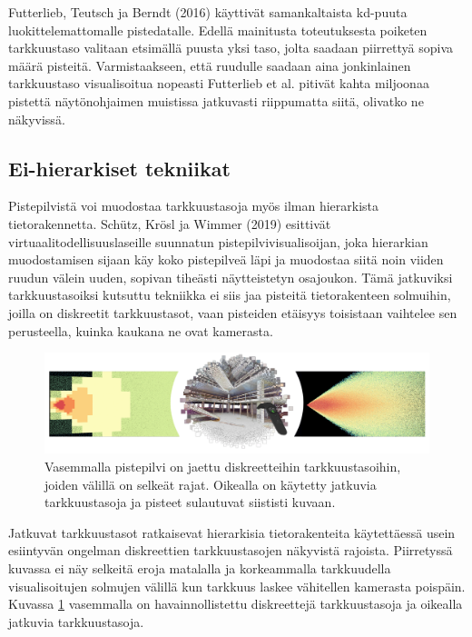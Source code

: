 Futterlieb, Teutsch ja Berndt (2016) käyttivät samankaltaista kd-puuta luokittelemattomalle pistedatalle. Edellä mainitusta toteutuksesta poiketen tarkkuustaso valitaan etsimällä puusta yksi taso, jolta saadaan piirrettyä sopiva määrä pisteitä. Varmistaakseen, että ruudulle saadaan aina jonkinlainen tarkkuustaso visualisoitua nopeasti Futterlieb et al. pitivät kahta miljoonaa pistettä näytönohjaimen muistissa jatkuvasti riippumatta siitä, olivatko ne näkyvissä. \cite{smooth}

\subsection{Ei-hierarkiset tekniikat}\label{ei-hier}

Pistepilvistä voi muodostaa tarkkuustasoja myös ilman hierarkista tietorakennetta. Schütz, Krösl ja Wimmer (2019) esittivät virtuaalitodellisuuslaseille suunnatun pistepilvivisualisoijan, joka hierarkian muodostamisen sijaan käy koko pistepilveä läpi ja muodostaa siitä noin viiden ruudun välein uuden, sopivan tiheästi näytteistetyn osajoukon. Tämä jatkuviksi tarkkuustasoiksi  kutsuttu tekniikka ei siis jaa pisteitä tietorakenteen solmuihin, joilla on diskreetit tarkkuustasot, vaan pisteiden etäisyys toisistaan vaihtelee sen perusteella, kuinka kaukana ne ovat kamerasta. \cite{clod}

\begin{figure}
    \centering
    \includegraphics[width=\textwidth]{img/clod.png}
    \caption{Vasemmalla pistepilvi on jaettu diskreetteihin tarkkuustasoihin, joiden välillä on selkeät rajat. Oikealla on käytetty jatkuvia tarkkuustasoja ja pisteet sulautuvat siististi kuvaan. \cite{clod}}
    \label{img:clod}
\end{figure}

Jatkuvat tarkkuustasot ratkaisevat hierarkisia tietorakenteita käytettäessä usein esiintyvän ongelman diskreettien tarkkuustasojen näkyvistä rajoista. Piirretyssä kuvassa ei näy selkeitä eroja matalalla ja korkeammalla tarkkuudella visualisoitujen solmujen välillä kun tarkkuus laskee vähitellen kamerasta poispäin. Kuvassa \ref{img:clod} vasemmalla on havainnollistettu diskreettejä tarkkuustasoja ja oikealla jatkuvia tarkkuustasoja.

